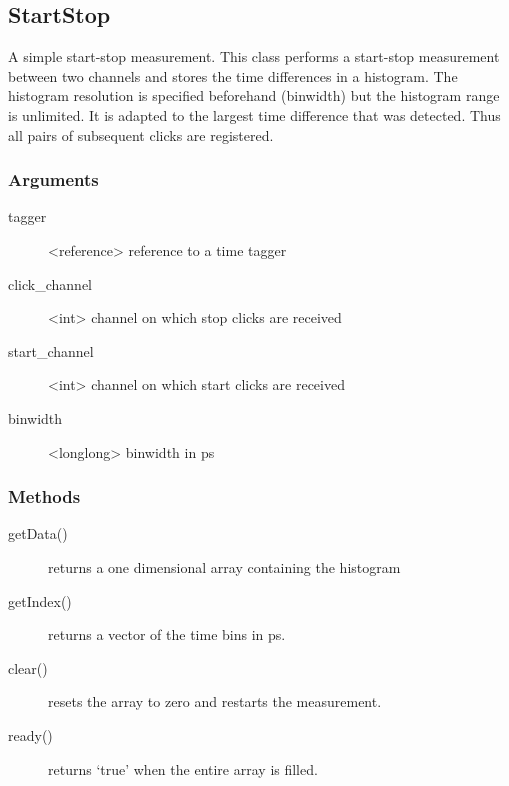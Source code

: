 \documentclass[letterpaper,10pt,english]{sphinxmanual}
\begin{document}
\subsection{StartStop}
\label{sections/api:startstop}
A simple start-stop measurement. This class performs a start-stop
measurement between two channels and stores the time differences
in a histogram. The histogram resolution
is specified beforehand (binwidth) but the histogram range is unlimited.
It is adapted to the largest time difference that was detected. Thus
all pairs of subsequent clicks are registered.


\subsubsection{Arguments}
\label{sections/api:id12}\begin{description}
\item[{tagger}] \leavevmode
\textless{}reference\textgreater{} reference to a time tagger

\item[{click\_channel}] \leavevmode
\textless{}int\textgreater{} channel on which stop clicks are received

\item[{start\_channel}] \leavevmode
\textless{}int\textgreater{} channel on which start clicks are received

\item[{binwidth}] \leavevmode
\textless{}longlong\textgreater{} binwidth in ps

\end{description}


\subsubsection{Methods}
\label{sections/api:id13}\begin{description}
\item[{getData()}] \leavevmode
returns a one dimensional array containing the histogram

\item[{getIndex()}] \leavevmode
returns a vector of the time bins in ps.

\item[{clear()}] \leavevmode
resets the array to zero and restarts the measurement.

\item[{ready()}] \leavevmode
returns `true' when the entire array is filled.

\end{description}
\end{document}
